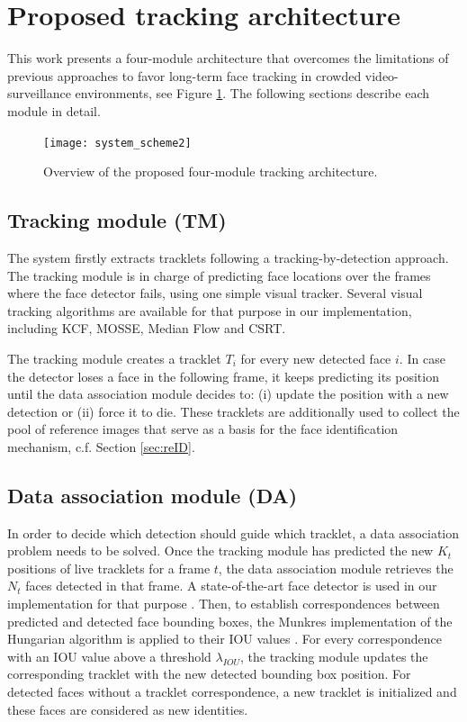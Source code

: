 
\section{Proposed tracking architecture}

This work presents a four-module architecture that overcomes the limitations of previous approaches to favor long-term face tracking in crowded video-surveillance environments, see Figure \ref{fig:system_scheme}.   
The following sections describe each module in detail. 

\begin{figure}[ht]
\centering
\texttt{[image: system\_scheme2]}
\caption{Overview of the proposed four-module tracking architecture.}
\label{fig:system_scheme}
\end{figure}

\subsection{Tracking module (TM)}
\label{sec:STFT}

The system firstly extracts tracklets following a tracking-by-detection approach.
The tracking module is in charge of predicting face locations over the frames where the face detector fails, using one simple visual tracker. Several visual tracking algorithms are available for that purpose in our implementation, including KCF, MOSSE, Median Flow and CSRT.  

The tracking module creates a tracklet ${T_i}$ for every new detected face $i$. In case the detector loses a face in the following frame, it keeps predicting its position until the data association module decides to: (i) update the position with a new detection or (ii) force it to die. These tracklets are additionally used to collect the pool of reference images that serve as a basis for the face identification mechanism, c.f. Section \ref{sec:reID}.


\subsection{Data association module (DA)}
\label{sec:DA}

In order to decide which detection should guide which tracklet, a data association problem needs to be solved. 
Once the tracking module has predicted the new $K_t$ positions of live tracklets for a frame $t$, the data association module retrieves the $N_t$ faces detected in that frame. A state-of-the-art face detector is used in our implementation for that purpose \cite{zhang2017faceboxes}. Then, to establish correspondences between predicted and detected face bounding boxes, the Munkres implementation of the Hungarian algorithm is applied to their IOU values \cite{kuhn1955hungarian}. For every correspondence with an IOU value above a threshold $\lambda_{IOU}$, the tracking module updates the corresponding tracklet with the new detected bounding box position. For detected faces without a tracklet correspondence, a new tracklet is initialized and these faces are considered as new identities.

